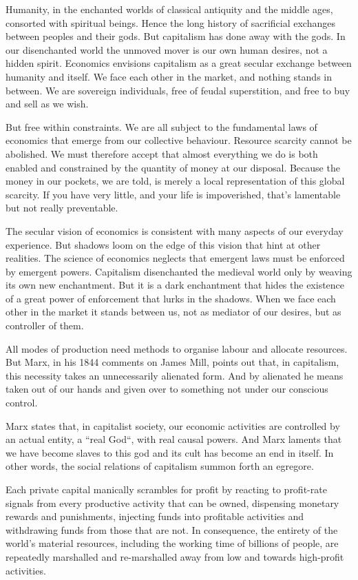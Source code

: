 \documentclass[
]{book}
\begin{document}
Humanity, in the enchanted worlds of classical antiquity and the middle ages, consorted with spiritual beings. Hence the long history of sacrificial exchanges between peoples and their gods. But capitalism has done away with the gods. In our disenchanted world the unmoved mover is our own human desires, not a hidden spirit. Economics envisions capitalism as a great secular exchange between humanity and itself. We face each other in the market, and nothing stands in between. We are sovereign individuals, free of feudal superstition, and free to buy and sell as we wish.

But free within constraints. We are all subject to the fundamental laws of economics that emerge from our collective behaviour. Resource scarcity cannot be abolished. We must therefore accept that almost everything we do is both enabled and constrained by the quantity of money at our disposal. Because the money in our pockets, we are told, is merely a local representation of this global scarcity. If you have very little, and your life is impoverished, that's lamentable but not really preventable.

The secular vision of economics is consistent with many aspects of our everyday experience. But shadows loom on the edge of this vision that hint at other realities. The science of economics neglects that emergent laws must be enforced by emergent powers. Capitalism disenchanted the medieval world only by weaving its own new enchantment. But it is a dark enchantment that hides the existence of a great power of enforcement that lurks in the shadows. When we face each other in the market it stands between us, not as mediator of our desires, but as controller of them.

All modes of production need methods to organise labour and allocate resources. But Marx, in his 1844 comments on James Mill, points out that, in capitalism, this necessity takes an unnecessarily alienated form. And by alienated he means taken out of our hands and given over to something not under our conscious control.

Marx states that, in capitalist society, our economic activities are controlled by an actual entity, a ``real God``, with real causal powers. And Marx laments that we have become slaves to this god and its cult has become an end in itself. In other words, the social relations of capitalism summon forth an egregore.

Each private capital manically scrambles for profit by reacting to profit-rate signals from every productive activity that can be owned, dispensing monetary rewards and punishments, injecting funds into profitable activities and withdrawing funds from those that are not. In consequence, the entirety of the world's material resources, including the working time of billions of people, are repeatedly marshalled and re-marshalled away from low and towards high-profit activities.
\end{document}
